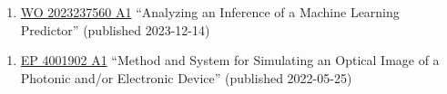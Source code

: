 
\newcommand{\patentref}[5]{\href{#4}{#1 #2} ``#3'' (granted #5)}
\newcommand{\patentpubref}[5]{\href{#4}{#1 #2} ``#3'' (published #5)}






{
    \ifdefined\shortcv
        {}
    \else
        {
            \begin{enumerate}
                \item [] \patentpubref{WO}
                                        {2023237560 A1}
                                        {Analyzing an Inference of a Machine Learning Predictor}
                                        {https://patentimages.storage.googleapis.com/3d/6c/b6/935e952fe109fa/WO2023237560A1.pdf}
                                        {2023-12-14}
            \end{enumerate}
        }
    \fi
}

{
    \ifdefined\shortcv
        {}
    \else
        {
            \begin{enumerate}
                \item [] \patentpubref{EP}
                                        {4001902 A1}
                                        {Method and System for Simulating an Optical Image of a Photonic and/or Electronic Device}
                                        {https://patentimages.storage.googleapis.com/36/85/0c/89e60111328058/EP4001902A1.pdf}
                                        {2022-05-25}
            \end{enumerate}
        }
    \fi
}


